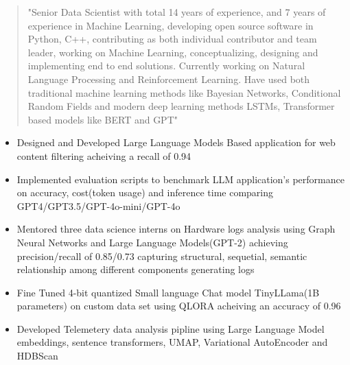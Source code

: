 \documentclass[10pt,a4paper,ragged2e,withhyper]{altacv}
\author{Gaurav Sood}
\date{\today}
\title{}
\begin{document}

\makecvheader

\begin{paracol}{1}
 \begin{quote}
"Senior Data Scientist with total 14 years of experience, and 7 years of experience in Machine Learning, developing open source software in Python, C++, contributing as both individual contributor and team leader, working on Machine Learning, conceptualizing, designing and implementing end to end solutions. Currently working on  Natural Language Processing and Reinforcement Learning. Have used both traditional machine learning methods like Bayesian Networks, Conditional Random Fields and modern deep learning methods LSTMs, Transformer based models like BERT and GPT"
 \end{quote}
\label{sec:org2540a44}


\divider

\divider


\label{sec:org08bb26d}

\begin{itemize}
\item Designed and Developed Large Language Models Based application for web content
filtering acheiving a recall of 0.94
\item Implemented evaluation scripts to benchmark LLM application's performance on
accuracy, cost(token usage) and inference time comparing GPT4/GPT3.5/GPT-4o-mini/GPT-4o
\item Mentored three data science interns on Hardware logs analysis using Graph
Neural Networks and Large Language Models(GPT-2) achieving precision/recall of
0.85/0.73 capturing structural, sequetial, semantic relationship among
different components generating logs
\item Fine Tuned 4-bit quantized Small language Chat model TinyLLama(1B parameters) on custom data set using QLORA
acheiving an accuracy of 0.96
\item Developed Telemetery data analysis pipline using Large Language Model
embeddings, sentence transformers, UMAP, Variational AutoEncoder and HDBScan
\end{itemize}


\end{paracol}
\end{document}
